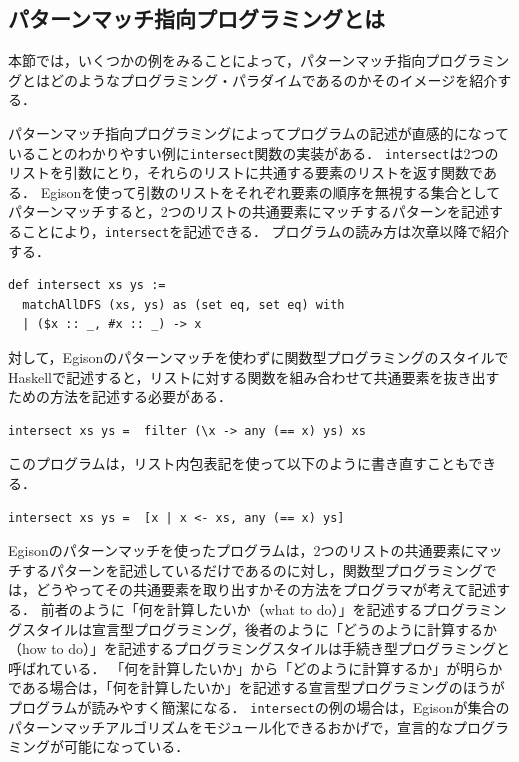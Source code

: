 \subsection{パターンマッチ指向プログラミングとは}

本節では，いくつかの例をみることによって，パターンマッチ指向プログラミングとはどのようなプログラミング・パラダイムであるのかそのイメージを紹介する．

パターンマッチ指向プログラミングによってプログラムの記述が直感的になっていることのわかりやすい例に\lstinline{intersect}関数の実装がある．
\lstinline{intersect}は2つのリストを引数にとり，それらのリストに共通する要素のリストを返す関数である．
Egisonを使って引数のリストをそれぞれ要素の順序を無視する集合としてパターンマッチすると，2つのリストの共通要素にマッチするパターンを記述することにより，\lstinline{intersect}を記述できる．
プログラムの読み方は次章以降で紹介する．
\begin{lstlisting}[language=egison,numbers=none]
def intersect xs ys :=
  matchAllDFS (xs, ys) as (set eq, set eq) with
  | ($x :: _, #x :: _) -> x
\end{lstlisting}
対して，Egisonのパターンマッチを使わずに関数型プログラミングのスタイルでHaskellで記述すると，リストに対する関数を組み合わせて共通要素を抜き出すための方法を記述する必要がある．
\begin{lstlisting}[language=egison,numbers=none]
intersect xs ys =  filter (\x -> any (== x) ys) xs
\end{lstlisting}
このプログラムは，リスト内包表記を使って以下のように書き直すこともできる．
\begin{lstlisting}[language=egison,numbers=none]
intersect xs ys =  [x | x <- xs, any (== x) ys]
\end{lstlisting}

Egisonのパターンマッチを使ったプログラムは，2つのリストの共通要素にマッチするパターンを記述しているだけであるのに対し，関数型プログラミングでは，どうやってその共通要素を取り出すかその方法をプログラマが考えて記述する．
前者のように「何を計算したいか（what to do）」を記述するプログラミングスタイルは宣言型プログラミング，後者のように「どうのように計算するか（how to do）」を記述するプログラミングスタイルは手続き型プログラミングと呼ばれている．
「何を計算したいか」から「どのように計算するか」が明らかである場合は，「何を計算したいか」を記述する宣言型プログラミングのほうがプログラムが読みやすく簡潔になる．
\lstinline{intersect}の例の場合は，Egisonが集合のパターンマッチアルゴリズムをモジュール化できるおかげで，宣言的なプログラミングが可能になっている．

